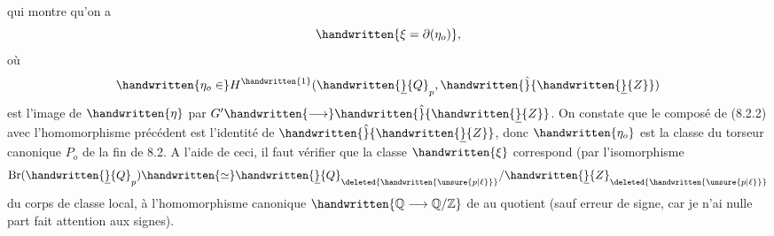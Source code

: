 qui montre qu'on  a
\[
\handwritten{\xi=\partial(\eta_o)},
\]
où
\[
\handwritten{\eta_o\in}H^{\handwritten{1}}(\handwritten{\underline}{Q}_p,\handwritten{\hat}{\handwritten{\underline}{Z}})
\]
est l'image de $\handwritten{\eta}$ par $G'\handwritten{\longrightarrow}\handwritten{\hat}{\handwritten{\underline}{Z}}$. On constate que le composé de (8.2.2) avec l'homomorphisme précédent est l'identité de $\handwritten{\hat}{\handwritten{\underline}{Z}}$, donc $\handwritten{\eta_o}$ est la classe du torseur canonique $P_o$ de la fin de 8.2. A l'aide de ceci, il faut vérifier que la classe $\handwritten{\xi}$ correspond (par l'isomorphisme
\[
\operatorname{Br}(\handwritten{\underline}{Q}_p)\handwritten{\simeq}\handwritten{\underline}{Q}_{\deleted{\handwritten{\unsure{p|\ell}}}}/\handwritten{\underline}{Z}_{\deleted{\handwritten{\unsure{p|\ell}}}}
\]
du corps de classe local, à l'homomorphisme canonique $\handwritten{\mathbb{Q}\longrightarrow\mathbb{Q}/\mathbb{Z}}$
de  au quotient (sauf erreur de signe, car je n'ai nulle part fait attention aux signes).

